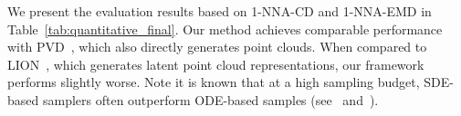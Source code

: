 { 
We present the evaluation results based on 1-NNA-CD and 1-NNA-EMD in Table~\ref{tab:quantitative_final}. 
%
Our method achieves comparable performance with PVD~\cite{zhou2021pvd}, which also directly generates point clouds. 
%
When compared to LION~\cite{zeng2022lion}, which generates latent point cloud representations, our framework performs slightly worse.
%
Note it is known that at a high sampling budget, SDE-based samplers often outperform ODE-based samples (see~\cite{karras2022elucidating} and~\cite{xu2023restart}).

}